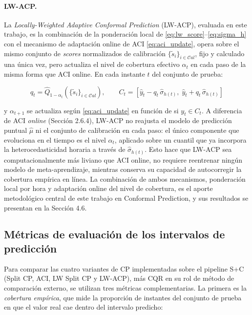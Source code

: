 \paragraph{LW-ACP.} La \textit{Locally-Weighted Adaptive Conformal Prediction} (LW-ACP), evaluada en este trabajo, es la combinación de la ponderación local de \eqref{eq:lw_score}--\eqref{eq:sigma_h} con el mecanismo de adaptación online de ACI \eqref{eq:aci_update}, opera sobre el mismo conjunto de \textit{scores} normalizados de calibración $\{\tilde{s}_i\}_{i \in \mathcal{C}al}$, fijo y calculado una única vez, pero actualiza el nivel de cobertura efectivo $\alpha_t$ en cada paso de la misma forma que ACI online. En cada instante $t$ del conjunto de prueba:

\begin{equation}
    q_t = \hat{Q}_{1-\alpha_t}\!\left(\{\tilde{s}_i\}_{i \in \mathcal{C}al}\right), \qquad
    C_t = \left[\hat{y}_t - q_t\,\hat{\sigma}_{h(t)},\; \hat{y}_t + q_t\,\hat{\sigma}_{h(t)}\right]
    \label{eq:lwacp_interval}
\end{equation}

y $\alpha_{t+1}$ se actualiza según \eqref{eq:aci_update} en función de si $y_t \in C_t$. A diferencia de ACI \textit{online} (Sección 2.6.4), LW-ACP no reajusta el modelo de predicción puntual $\hat{\mu}$ ni el conjunto de calibración en cada paso: el único componente que evoluciona en el tiempo es el nivel $\alpha_t$, aplicado sobre un cuantil que ya incorpora la heterocedasticidad horaria a través de $\hat{\sigma}_{h(t)}$. Esto hace que LW-ACP sea computacionalmente más liviano que ACI online, no requiere reentrenar ningún modelo de meta-aprendizaje, mientras conserva su capacidad de autocorregir la cobertura empírica en línea. La combinación de ambos mecanismos, ponderación local por hora y adaptación online del nivel de cobertura, es el aporte metodológico central de este trabajo en Conformal Prediction, y sus resultados se presentan en la Sección 4.6.

\subsection{Métricas de evaluación de los intervalos de predicción}
\label{sec:metricas_cp}

Para comparar las cuatro variantes de CP implementadas sobre el pipeline S+C (Split CP, ACI, LW Split CP y LW-ACP), más CQR en su rol de método de comparación externo, se utilizan tres métricas complementarias. La primera es la \textit{cobertura empírica}, que mide la proporción de instantes del conjunto de prueba en que el valor real cae dentro del intervalo predicho:

